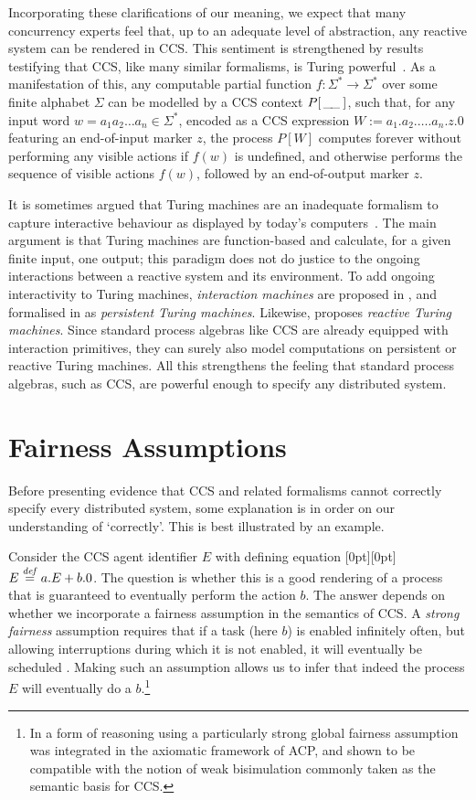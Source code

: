 \documentclass[smallcondensed]{svjour3}
\newcommand{\plat}[1]{\raisebox{0pt}[0pt][0pt]{#1}}  \def\precond#1{{\vphantom{#1}}^\bullet #1}
\newcounter {part}
\begin{document}
Incorporating these clarifications of our meaning, we expect that many concurrency experts feel that,
up to an adequate level of abstraction, any reactive system can be rendered in CCS\@.
This sentiment is strengthened by results testifying that CCS,
like many similar formalisms, is Turing powerful~\cite{Mi89}.
As a manifestation of this, any computable partial function $f:\Sigma^* \rightarrow \Sigma^*$ over some
finite alphabet $\Sigma$ can be modelled by a CCS context $P[\,\_\!\_\hspace{2.3pt}]$, such that,
for any input word $w=a_1a_2\dots a_n\in\Sigma^*$, encoded as a CCS expression
$W:=a_1.a_2.\dots.a_n.z.0$ featuring an end-of-input marker $z$, the process $P[W]$ computes
forever without performing any visible actions if $f(w)$ is undefined, and otherwise performs the
sequence of visible actions $f(w)$, followed by an end-of-output marker $z$.

It is sometimes argued that Turing machines are an inadequate formalism to capture interactive
behaviour as displayed by today's computers~\cite{Wegner97,LW01}.
The main
argument is that Turing machines are function-based and 
calculate, for a given finite input, one output;
this paradigm does not do justice to the ongoing interactions between a reactive system and its
environment.
To add ongoing interactivity to Turing machines, \emph{interaction machines} are proposed in
\cite{Wegner97}, and formalised in \cite{GSAS04} as \emph{persistent Turing machines}. Likewise,
\cite{BLT11} proposes \emph{reactive Turing machines}.
Since standard process algebras like CCS are already equipped with interaction primitives,
they can surely also model computations on persistent or reactive Turing machines.
All this strengthens the feeling
that standard process algebras, such as CCS,
are powerful enough to specify any distributed system.

\section{Fairness Assumptions}{\label{sec:fairness}}


Before presenting evidence that CCS and related formalisms cannot correctly specify every distributed system,
some explanation is in order on our understanding of `correctly'. This is best illustrated by an example.
\advance\textheight 1pt

Consider the CCS agent identifier $E$ with defining equation \plat{$E \stackrel{{\it def}}{=} a.E + b.0$}.
The question is whether this is a good rendering of a process that is guaranteed to eventually
perform the action $b$. The answer depends on whether we incorporate a fairness assumption in the
semantics of CCS\@. A \emph{strong fairness} assumption requires that if a task (here $b$) is enabled
infinitely often, but allowing interruptions during which it is not enabled, it will eventually be
scheduled \cite{GPSS80,LPS81}.
Making such an assumption allows us to infer that indeed the process $E$ will eventually do a $b$.\footnote{In \cite{BBK87a} a form of reasoning using a particularly strong global fairness assumption
was integrated in the axiomatic framework of ACP, and shown to be compatible with the notion of
weak bisimulation commonly taken as the semantic basis for CCS\@.}
\end{document}
